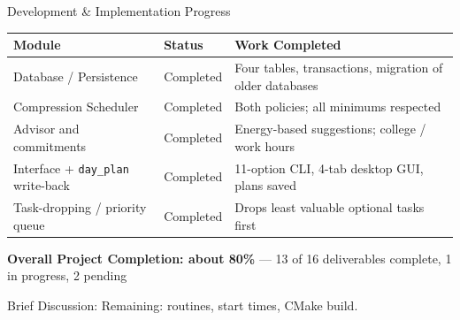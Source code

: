 \documentclass[aspectratio=169,11pt]{beamer}
\newcommand{\smallnote}[1]{%
\vspace{0.08cm}
{\scriptsize\color{GEUGrey}#1}
}
\begin{document}
\begin{frame}{Development \& Implementation Progress}

\scriptsize

\begin{center}

\renewcommand{\arraystretch}{1.25}

\begin{tabularx}{.96\textwidth}
{@{}p{3.2cm}p{1.9cm}X@{}}

\toprule
\textbf{Module} &
\textbf{Status} &
\textbf{Work Completed}\\
\midrule

Database / Persistence &
Completed &
Four tables, transactions, migration of older databases\\

Compression Scheduler &
Completed &
Both policies; all minimums respected\\

Advisor and commitments &
Completed &
Energy-based suggestions; college / work hours\\

Interface + \texttt{day\_plan} write-back &
Completed &
11-option CLI, 4-tab desktop GUI, plans saved\\

Task-dropping / priority queue &
Completed &
Drops least valuable optional tasks first\\

\bottomrule

\end{tabularx}

\end{center}

\vspace{3mm}

\begin{center}
\colorbox{GEULightBlue}{
\parbox{.78\textwidth}{
\centering
\textbf{Overall Project Completion: about 80\%} ---
13 of 16 deliverables complete, 1 in progress, 2 pending
}}
\end{center}

\vfill

\smallnote{
Brief Discussion: Remaining: routines, start times, CMake build.
}

\end{frame}
\end{document}
